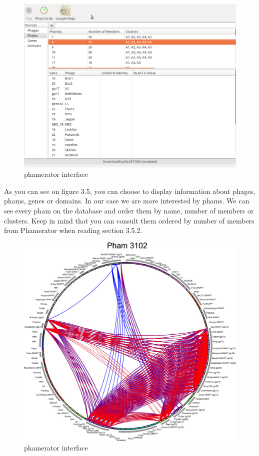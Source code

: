 \documentclass[a4paper,11pt]{report}
\begin{document}
\begin{figure}[H] 
	\begin{center}
		\includegraphics[scale=0.3]{img/phamerator_2}
		\caption{phamerator interface}
	\end{center}
\end{figure}

As you can see on figure 3.5, you can choose to display information about phages, phams, genes or domains. In our case we are more interested by phams. We can see every pham on the database and order them by name, number of members or clusters. Keep in mind that you can consult them ordered by number of members from Phamerator when reading section 3.5.2.

\begin{figure}[H] 
	\begin{center}
		\includegraphics[scale=0.45]{img/12859_2011_Article_4954_Fig8_HTML}
		\caption{phamerator interface}
	\end{center}
\end{figure}
\end{document}
